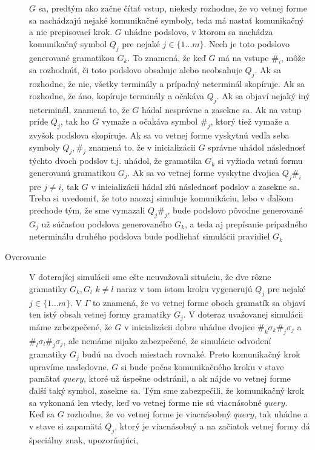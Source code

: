 \begin{dokaz}
\begin{description}
  $G$ sa, predtým ako začne čítať vstup, niekedy rozhodne, že
  vo vetnej forme sa nachádzajú nejaké komunikačné symboly, teda
  má nastať komunikačný a nie prepisovací krok. $G$ uhádne podslovo,
  v ktorom sa nachádza komunikačný symbol $Q_j$ pre nejaké $j\in\{ 1\dots
  m\}$. Nech je toto podslovo generované gramatikou $G_k$. To znamená,
  že keď $G$ má na vstupe $\#_i$, môže sa
  rozhodnúť, či toto podslovo obsahuje alebo neobsahuje $Q_j$. Ak
  sa rozhodne, že nie, všetky terminály a prípadný neterminál
  skopíruje. Ak sa rozhodne, že áno, kopíruje terminály a očakáva
  $Q_j$. Ak sa objaví nejaký iný neterminál, znamená to, že $G$
  hádal nesprávne a zasekne sa. Ak na vstup príde $Q_j$, tak ho
  $G$ vymaže a očakáva symbol $\#_j$, ktorý tiež vymaže a zvyšok podslova
  skopíruje. Ak sa vo vetnej forme vyskytnú vedľa seba symboly
  $Q_j,\#_j$ znamená to, že v inicializácii $G$ správne uhádol
  následnosť týchto dvoch podslov t.j. uhádol, že gramatika $G_k$
  si vyžiada vetnú formu generovanú gramatikou $G_j$. Ak sa vo vetnej
  forme vyskytne dvojica $Q_j\#_i$ pre $j\neq i$, tak $G$ v inicializácii hádal
  zlú následnosť podslov a zasekne sa. Treba si uvedomiť, že toto
  naozaj simuluje komunikáciu, lebo v ďalšom prechode tým, že sme vymazali
  $Q_j\#_j$, bude podslovo pôvodne generované $G_j$ už súčasťou
  podslova generovaného $G_k$, a teda aj prepísanie prípadného
  neterminálu druhého podslova bude podliehať simulácii pravidiel
  $G_k$
  \item[Overovanie]
   V doterajšej simulácii sme ešte neuvažovali situáciu, že dve rôzne
  gramatiky $G_k,G_l$ $k\neq l$ naraz v tom istom kroku vygenerujú
  $Q_j$ pre nejaké $j\in \{ 1\dots m\}$. V $\Gamma$ to znamená, že
  vo vetnej forme oboch gramatík sa objaví ten istý obsah vetnej
  formy gramatiky $G_j$. V doteraz uvažovanej simulácii máme
  zabezpečené, že $G$ v inicializácii dobre uhádne dvojice
  $\#_k\sigma_k\#_j\sigma_j$ a $\#_l\sigma_l\#_j\sigma_j$, ale
  nemáme nijako zabezpečené, že simulácie odvodení gramatiky $G_j$
  budú na dvoch miestach rovnaké. Preto komunikačný krok upravíme
  nasledovne. $G$ si bude počas komunikačného kroku v stave pamätať
  $query$, ktoré už úspešne odstránil, a ak nájde vo vetnej forme
  ďalší taký symbol, zasekne sa. Tým sme zabezpečili,
  že komunikačný krok sa vykonaná len vtedy, keď vo vetnej forme
  nie sú viacnásobné $query$.
  \\ Keď sa $G$ rozhodne, že vo vetnej forme je viacnásobný
  $query$, tak uhádne a v stave si zapamätá $Q_j$, ktorý je
  viacnásobný a na začiatok vetnej formy dá špeciálny znak, upozorňujúci,

\end{description}
\end{dokaz}
